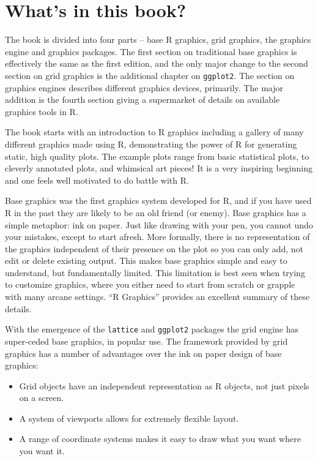 \documentclass[12pt]{article}
\begin{document}
\section{What's in this book?}

The book is divided into four parts -- base R graphics, grid graphics,
the graphics engine and graphics packages. The first section on
traditional base graphics is effectively the same as the first edition, and the
only major change to the second section on grid graphics is the
additional chapter on \texttt{ggplot2}.  The section on graphics
engines describes different graphics devices, primarily. The major
addition is the fourth section giving a supermarket of details on
available graphics tools in R.

The book starts with an introduction to R graphics including a gallery
of many different graphics made using R, demonstrating the power of R
for generating static, high quality plots. The example plots range
from basic statistical plots, to cleverly annotated plots, and
whimsical art pieces! It is a very inspiring beginning and one feels
well motivated to do battle with R.

Base graphics was the first graphics system developed for R, and if
you have used R in the past they are likely to be an old friend (or
enemy). Base graphics has a simple metaphor: ink on paper. Just like
drawing with your pen, you cannot undo your mistakes, except to start
afresh. More formally, there is no representation of the graphics
independent of their presence on the plot so you can only add, not
edit or delete existing output. This makes base graphics simple and
easy to understand, but fundamentally limited.  This limitation is
best seen when trying to customize graphics, where you either need to
start from scratch or grapple with many arcane settings. ``R
Graphics'' provides an excellent summary of these details.

With the emergence of the \texttt{lattice} and \texttt{ggplot2}
packages the grid engine has super-ceded base graphics, in popular use.
The framework provided by grid graphics has a number of advantages
over the ink on paper design of base graphics:

\begin{itemize} \itemsep 0in

\item Grid objects have an independent representation as R objects,
not just pixels on a screen.

\item A system of viewports allows for extremely flexible layout.

\item A range of coordinate systems makes it easy to draw what you
want where you want it.

\end{itemize}
\end{document}
